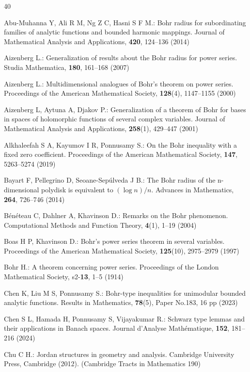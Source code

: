 \documentclass{birkjour}
\theoremstyle{plain}
\theoremstyle{definition}
\theoremstyle{definition}
\begin{document}
\begin{thebibliography}{40}
	
	Abu-Muhanna Y, Ali R M, Ng Z C, Hasni S F M.: Bohr radius for subordinating families of analytic functions and bounded harmonic mappings. Journal of Mathematical Analysis and Applications, \textbf{420}, 124--136 (2014)
	
	Aizenberg L.: Generalization of results about the Bohr radius for power series. Studia Mathematica, \textbf{180}, 161--168 (2007)
	
	Aizenberg L.: Multidimensional analogues of Bohr's theorem on power series. Proceedings of the American Mathematical Society, \textbf{128}(4), 1147--1155 (2000)
	
	Aizenberg L, Aytuna A, Djakov P.: Generalization of a theorem of Bohr for bases in spaces of holomorphic functions of several complex variables. Journal of Mathematical Analysis and Applications, \textbf{258}(1), 429--447 (2001)
	
	Alkhaleefah S A, Kayumov I R, Ponnusamy S.: On the Bohr inequality with a fixed zero coefficient. Proceedings of the American Mathematical Society, \textbf{147}, 5263--5274 (2019)
	
	Bayart F, Pellegrino D, Seoane-Sepúlveda J B.: The Bohr radius of the n-dimensional polydisk is equivalent to $(\log n)/n$. Advances in Mathematics, \textbf{264}, 726--746 (2014)
	
	Bénéteau C, Dahlner A, Khavinson D.: Remarks on the Bohr phenomenon. Computational Methods and Function Theory, \textbf{4}(1), 1--19 (2004)
	
	Boas H P, Khavinson D.: Bohr's power series theorem in several variables. Proceedings of the American Mathematical Society, \textbf{125}(10), 2975--2979 (1997)
	
	Bohr H.: A theorem concerning power series. Proceedings of the London Mathematical Society, s2-\textbf{13}, 1--5 (1914)
	
	Chen K, Liu M S, Ponnusamy S.: Bohr-type inequalities for unimodular bounded analytic functions. Results in Mathematics, \textbf{78}(5), Paper No.183, 16 pp (2023)
	
	Chen S L, Hamada H, Ponnusamy S, Vijayakumar R.: Schwarz type lemmas and their applications in Banach spaces. Journal d'Analyse Mathématique, \textbf{152}, 181--216 (2024)
	
	Chu C H.: Jordan structures in geometry and analysis. Cambridge University Press, Cambridge (2012). (Cambridge Tracts in Mathematics 190)
	

\end{thebibliography}
\end{document}
